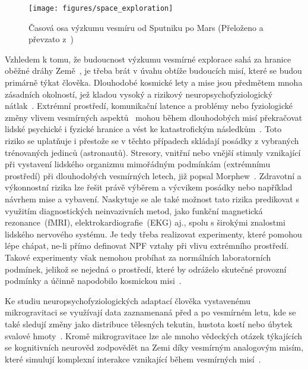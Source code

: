 \begin{figure}[!htb]
    \begin{center}
        \texttt{[image: figures/space\_exploration]}
        \caption{Časová osa výzkumu vesmíru od Sputniku po Mars (Přeloženo a
            převzato z~\cite{bartu})}
        \label{fig:space_exploration}
    \end{center}
\end{figure}

Vzhledem k tomu, že budoucnost výzkumu vesmírné explorace sahá za hranice oběžné
dráhy Země~\cite{salotti2014roadmap,viscio2014methodology}, je třeba brát v
úvahu obtíže budoucích misí, které se budou primárně týkat člověka. Dlouhodobé
kosmické lety a mise jsou předmětem mnoha zásadních okolností, jež kladou vysoký
a rizikový neuropsychofyziologický nátlak~\cite{Mogilever2018}. Extrémní
prostředí, komunikační latence a problémy nebo fyziologické změny vlivem
vesmírných aspektů~\cite{Buguet2007,Williams2009,Roy2021} mohou během
dlouhodobých misí překračovat lidské psychické i fyzické hranice a vést ke
katastrofickým následkům~\cite{Strangman2014,Mogilever2018}. Toto riziko se
uplatňuje i přestože se v těchto případech skládají posádky z vybraných
trénovaných jedinců (astronautů). Stresory, vnitřní nebo vnější stimuly
vznikající při vystavení lidského organizmu mimořádným podmínkám (extrémnímu
prostředí) při dlouhodobých vesmírných letech, již popsal
Morphew~\cite{morphew2001psychological}. Zdravotní a výkonnostní rizika lze
řešit právě výběrem a výcvikem posádky nebo například návrhem mise a vybavení.
Naskytuje se ale také možnost tato rizika predikovat s využitím diagnostických
neinvazivních metod, jako funkční magnetická rezonance~(\gls{fMRI}),
elektrokardiografie~(\gls{EKG}) aj., spolu s širokými znalostmi lidského
nervového systému. Je tedy třeba realizovat experimenty, které pomohou lépe
chápat, ne-li přímo definovat NPF vztahy při vlivu extrémního prostředí. Takové
experimenty však nemohou probíhat za normálních laboratorních podmínek, jelikož
se nejedná o prostředí, které by odráželo skutečné provozní podmínky a účinně
napodobilo kosmickou misi~\cite{Mogilever2018,Pagel2016}.

Ke studiu neuropsychofyziologických adaptací člověka vystavenému mikrogravitaci
se využívají data zaznamenaná před a po vesmírném letu, kde se také sledují
změny jako distribuce tělesných tekutin, hustota kostí nebo úbytek svalové
hmoty~\cite{Stein2012WeightMA}. Kromě mikrogravitace lze ale mnoho vědeckých
otázek týkajících se kognitivních neurověd zodpovědět na Zemi díky vesmírným
analogovým misím, které simulují komplexní interakce vznikající během vesmírných
misí~\cite{Pagel2016,Mogilever2018}.


